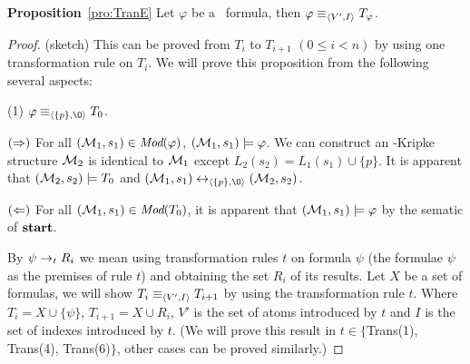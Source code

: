 \documentclass[letterpaper]{article} %
\begin{document}
\noindent\textbf{Proposition}~\ref{pro:TranE}
 Let $\varphi$ be a \CTL\ formula, then $\varphi \equiv_{{\langle{V', I}\rangle}} T_{\varphi}$.
\begin{proof} (sketch)
This can be proved from $T_i$ to $T_{i+1}$ $(0\leq i < n)$ by using one transformation rule on $T_i$.
We will prove this proposition from the following several aspects:

(1) $\varphi \equiv_{\tuple{\{p\}, {\O}}} T_0$.

$(\Rightarrow)$ For all $({\cal M}_1,s_1) \in \textit{Mod}(\varphi)$, \ie $({\cal M}_1,s_1) \models \varphi$. We can construct an \Ind-Kripke structure ${\cal M}_2$ is identical to ${\cal M}_1$ except $L_2(s_2) = L_1(s_1) \cup \{p\}$. It is apparent that $({\cal M}_2,s_2) \models T_0$ and $(\Hm_1, s_1) \lrto_{\tuple{\{p\}, {\O}}} (\Hm_2, s_2)$.

$(\Leftarrow)$ For all $({\cal M}_1,s_1) \in \textit{Mod}(T_0)$, it is apparent that $({\cal M}_1,s_1) \models \varphi$ by the sematic of $\textbf{start}$.

By $\psi \rightarrow_t R_i$ we mean using transformation rules $t$ on formula $\psi$ (the formulae $\psi$ as the
premises of rule $t$) and obtaining the set  $R_i$ of its results. Let $X$ be a set of formulas,
we will show $T_i \equiv_{{\langle{V',I}\rangle}} T_{i+1}$ by using the transformation rule $t$. Where $T_i= X \cup \{\psi\}$, $T_{i+1}=X \cup R_i$, $V'$ is the set of atoms introduced by $t$ and $I$ is the set of indexes introduced by $t$. (We will prove this result in $t\in \{$Trans(1), Trans(4), Trans(6)$\}$, other cases can be proved similarly.)


\end{proof}
\end{document}
